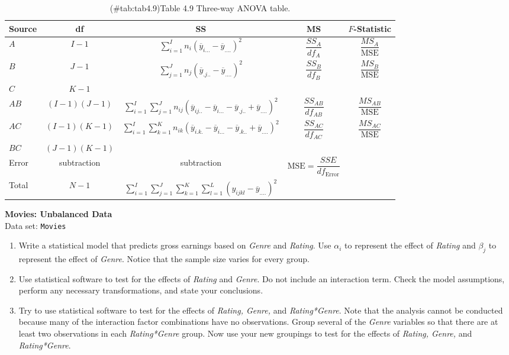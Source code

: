 \documentclass[
]{report}
\begin{document}
\begin{list}{E.}{ \setlength{\itemsep}{1.2em}}
\begin{table}[!h]
\centering
\caption{(\#tab:tab4.9)Table 4.9 Three-way ANOVA table.}
\centering
\begin{tabular}[t]{lcccc}
\toprule
Source & df & SS & MS & $F$-Statistic\\
\midrule
$A$ & $I - 1$ & $\displaystyle\sum_{i=1}^{I} n_i (\overline{y}_{i...} - \overline{y}_{....})^2$ & $\dfrac{SS_A}{df_A}$ & $\dfrac{MS_A}{\text{MSE}}$\\
$B$ & $J - 1$ & $\displaystyle\sum_{j=1}^{J} n_j (\overline{y}_{.j..} - \overline{y}_{....})^2$ & $\dfrac{SS_B}{df_B}$ & $\dfrac{MS_B}{\text{MSE}}$\\
$C$ & $K - 1$ &  &  & \\
$AB$ & $(I-1)(J-1)$ & $\displaystyle\sum_{i=1}^I\sum_{j=1}^J n_{ij}(\overline{y}_{ij..} - \overline{y}_{i...} - \overline{y}_{.j..} + \overline{y}_{....})^2$ & $\dfrac{SS_{AB}}{df_{AB}}$ & $\dfrac{MS_{AB}}{\text{MSE}}$\\
$AC$ & $(I-1)(K-1)$ & $\displaystyle\sum_{i=1}^I\sum_{k=1}^K n_{ik}(\overline{y}_{i.k.} - \overline{y}_{i...} - \overline{y}_{.k..} + \overline{y}_{....})^2$ & $\dfrac{SS_{AC}}{df_{AC}}$ & $\dfrac{MS_{AC}}{\text{MSE}}$\\
\addlinespace
$BC$ & $(J-1)(K-1)$ &  &  & \\
Error & subtraction & subtraction & $\text{MSE} = \dfrac{SSE}{df_{\text{Error}}}$ & \\
Total & $N-1$ & $\displaystyle\sum_{i=1}^I\sum_{j=1}^J\sum_{k=1}^K\sum_{l=1}^L (y_{ijkl} - \overline{y}_{....})^2$ &  & \\
\bottomrule
\end{tabular}
\end{table}

  \item \textbf{Movies: Unbalanced Data}\\
  Data set: \texttt{Movies}
  \begin{enumerate}
    \item Write a statistical model that predicts gross earnings based on \textit{Genre} and \textit{Rating}. Use $\alpha_i$ to represent the effect of \textit{Rating} and $\beta_j$ to represent the effect of \textit{Genre}. Notice that the sample size varies for every group.
    \item Use statistical software to test for the effects of \textit{Rating} and \textit{Genre}. Do not include an interaction term. Check the model assumptions, perform any necessary transformations, and state your conclusions.
    \item Try to use statistical software to test for the effects of \textit{Rating, Genre,} and \textit{Rating*Genre}. Note that the analysis cannot be conducted because many of the interaction factor combinations have no observations. Group several of the \textit{Genre} variables so that there are at least two observations in each \textit{Rating*Genre} group. Now use your new groupings to test for the effects of \textit{Rating, Genre,} and \textit{Rating*Genre}.
  \end{enumerate}


\end{list}
\end{document}
